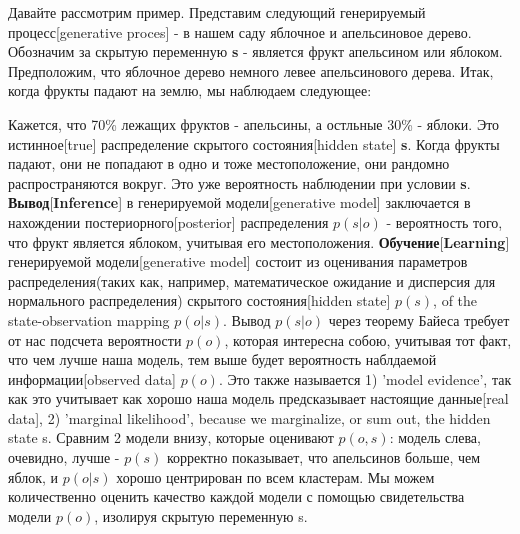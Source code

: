 \documentclass[twoside,leqno, 11pt]{article}
\begin{document}
	Давайте рассмотрим пример. Представим следующий генерируемый процесс[generative proces] - в нашем саду яблочное и апельсиновое дерево. Обозначим за скрытую переменную \textbf{s} - является фрукт апельсином или яблоком. Предположим, что яблочное дерево немного левее апельсинового дерева. Итак, когда фрукты падают на землю, мы наблюдаем следующее:

	\begin{figure}[h]
		\label{ris:image}
	\end{figure}

	Кажется, что 70\% лежащих фруктов - апельсины, а остльные 30\% - яблоки. Это истинное[true] распределение скрытого состояния[hidden state] \textbf{s}. Когда фрукты падают, они не попадают в одно и тоже местоположение, они рандомно распространяются вокруг. Это уже вероятность наблюдении при условии \textbf{s}. \textbf{Вывод}[\textbf{Inference}] в генерируемой модели[generative model] заключается в нахождении постериорного[posterior] распределения $p(s|o)$ - вероятность того, что фрукт является яблоком, учитывая его местоположения. \textbf{Обучение}[\textbf{Learning}] генерируемой модели[generative model] состоит из оценивания параметров распределения(таких как, например, математическое ожидание и дисперсия для нормального распределения) скрытого состояния[hidden state] $p(s)$, of the state-observation mapping $p(o|s)$. Вывод $p(s|o)$ через теорему Байеса требует от нас подсчета вероятности $p(o)$, которая интересна собою, учитывая тот факт, что чем лучше наша модель, тем выше будет вероятность наблдаемой информации[observed data] $p(o)$. Это также называется 1) 'model evidence', так как это учитывает как хорошо наша модель предсказывает настоящие данные[real data], 2) 'marginal likelihood',  because we marginalize, or sum out, the hidden state s.
	Сравним 2 модели внизу, которые оценивают $p(o,s)$: модель слева, очевидно, лучше - $p(s)$ корректно показывает, что апельсинов больше, чем яблок, и $p(o|s)$ хорошо центрирован по всем кластерам. Мы можем количественно оценить качество каждой модели с помощью свидетельства модели $p(o)$, изолируя скрытую переменную s.
	
\end{document}
